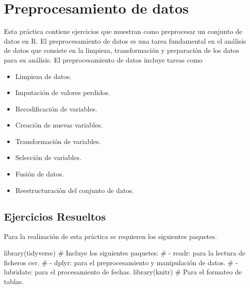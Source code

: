 \documentclass[
  spanish,
  a4paper,
]{scrreport}
\newenvironment{Shaded}{\begin{snugshade}}{\end{snugshade}}
\newcommand{\CommentTok}[1]{\textcolor[rgb]{0.37,0.37,0.37}{#1}}
\newcommand{\FunctionTok}[1]{\textcolor[rgb]{0.28,0.35,0.67}{#1}}
\newcommand{\NormalTok}[1]{\textcolor[rgb]{0.00,0.23,0.31}{#1}}
\providecommand{\tightlist}{%
  \setlength{\itemsep}{0pt}\setlength{\parskip}{0pt}}
\theoremstyle{definition}
\theoremstyle{remark}
\begin{document}

\chapter{Preprocesamiento de datos}\label{preprocesamiento-de-datos}

Esta práctica contiene ejercicios que muestran como preprocesar un
conjunto de datos en R. El preprocesamiento de datos es una tarea
fundamental en el análisis de datos que consiste en la limpieza,
transformación y preparación de los datos para su análisis. El
preprocesamiento de datos incluye tareas como

\begin{itemize}
\tightlist
\item
  Limpieza de datos.
\item
  Imputación de valores perdidos.
\item
  Recodificación de variables.
\item
  Creación de nuevas variables.
\item
  Transformación de variables.
\item
  Selección de variables.
\item
  Fusión de datos.
\item
  Reestructuración del conjunto de datos.
\end{itemize}

\section{Ejercicios Resueltos}\label{ejercicios-resueltos-1}

Para la realización de esta práctica se requieren los siguientes
paquetes.

\begin{Shaded}
\begin{Highlighting}[]
\FunctionTok{library}\NormalTok{(tidyverse) }
\CommentTok{\# Incluye los siguientes paquetes:}
\CommentTok{\# {-} readr: para la lectura de ficheros csv. }
\CommentTok{\# {-} dplyr: para el preprocesamiento y manipulación de datos.}
\CommentTok{\# {-} lubridate: para el procesamiento de fechas.}
\FunctionTok{library}\NormalTok{(knitr) }\CommentTok{\# Para el formateo de tablas.}
\end{Highlighting}
\end{Shaded}
\end{document}
